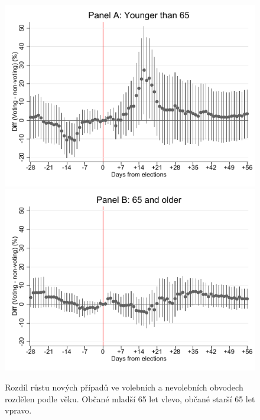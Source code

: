   
\begin{figure}
    \centering
    \includegraphics[scale=0.58]{Covid+_growth_rate14_less65.pdf} 
    \includegraphics[scale=0.58]{Covid+_growth_rate14_older65.pdf} 
 \label{fig:heterogen_age}
    \caption{Rozdíl růstu nových případů ve volebních a nevolebních obvodech rozdělen podle věku. Občané mladší 65 let vlevo, občané starší 65 let vpravo.}
\end{figure}

